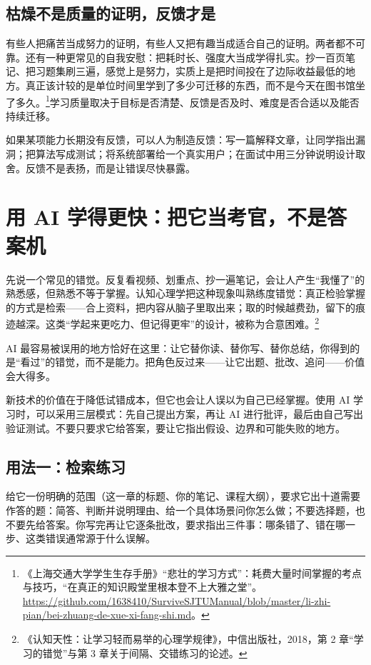 \documentclass[UTF8,zihao=5,openany]{ctexbook}
\begin{document}
\subsection{枯燥不是质量的证明，反馈才是}
有些人把痛苦当成努力的证明，有些人又把有趣当成适合自己的证明。两者都不可靠。还有一种更常见的自我安慰：把耗时长、强度大当成学得扎实。抄一百页笔记、把习题集刷三遍，感觉上是努力，实质上是把时间投在了边际收益最低的地方。真正该计较的是单位时间里学到了多少可迁移的东西，而不是今天在图书馆坐了多久。\footnote{《上海交通大学学生生存手册》“悲壮的学习方式”：耗费大量时间掌握的考点与技巧，“在真正的知识殿堂里根本登不上大雅之堂”。\url{https://github.com/1638410/SurviveSJTUManual/blob/master/li-zhi-pian/bei-zhuang-de-xue-xi-fang-shi.md}。}学习质量取决于目标是否清楚、反馈是否及时、难度是否合适以及能否持续迁移。

如果某项能力长期没有反馈，可以人为制造反馈：写一篇解释文章，让同学指出漏洞；把算法写成测试；将系统部署给一个真实用户；在面试中用三分钟说明设计取舍。反馈不是表扬，而是让错误尽快暴露。

\section{用 AI 学得更快：把它当考官，不是答案机}

先说一个常见的错觉。反复看视频、划重点、抄一遍笔记，会让人产生“我懂了”的熟悉感，但熟悉不等于掌握。认知心理学把这种现象叫熟练度错觉：真正检验掌握的方式是检索——合上资料，把内容从脑子里取出来；取的时候越费劲，留下的痕迹越深。这类“学起来更吃力、但记得更牢”的设计，被称为合意困难。\footnote{《认知天性：让学习轻而易举的心理学规律》，中信出版社，2018，第 2 章“学习的错觉”与第 3 章关于间隔、交错练习的论述。}

AI 最容易被误用的地方恰好在这里：让它替你读、替你写、替你总结，你得到的是“看过”的错觉，而不是能力。把角色反过来——让它出题、批改、追问——价值会大得多。

新技术的价值在于降低试错成本，但它也会让人误以为自己已经掌握。使用 AI 学习时，可以采用三层模式：先自己提出方案，再让 AI 进行批评，最后由自己写出验证测试。不要只要求它给答案，要让它指出假设、边界和可能失败的地方。

\subsection{用法一：检索练习}
给它一份明确的范围（这一章的标题、你的笔记、课程大纲），要求它出十道需要作答的题：简答、判断并说明理由、给一个具体场景问你怎么做；不要选择题，也不要先给答案。你写完再让它逐条批改，要求指出三件事：哪条错了、错在哪一步、这类错误通常源于什么误解。
\end{document}
